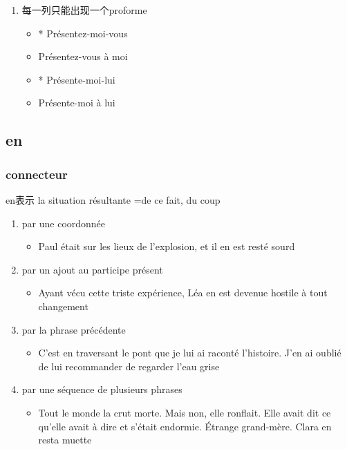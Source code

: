 \documentclass[UTF8]{report}
\begin{document}
\begin{enumerate}
    \item 每一列只能出现一个proforme
    \begin{itemize}
        \item * Présentez-moi-vous
        \item Présentez-vous à moi
        \item * Présente-moi-lui 
        \item Présente-moi à lui
    \end{itemize}
\end{enumerate}

\subsection{en}
\subsubsection{connecteur}
en表示 la situation résultante =de ce fait, du coup

\begin{enumerate}
    \item par une coordonnée
    \begin{itemize}
        \item Paul était sur les lieux de l’explosion, et il en est resté sourd
    \end{itemize}
    \item par un ajout au participe présent
    \begin{itemize}
        \item Ayant vécu cette triste expérience, Léa en est devenue hostile à tout changement
    \end{itemize}
    \item par la phrase précédente
    \begin{itemize}
        \item C’est en traversant le pont que je lui ai raconté l’histoire. J’en ai oublié de lui recommander de regarder l’eau grise
    \end{itemize}
    \item par une séquence de plusieurs phrases
    \begin{itemize}
        \item Tout le monde la crut morte. Mais non, elle ronflait. Elle avait dit ce qu’elle avait à dire et s’était endormie. Étrange grand-mère. Clara en resta muette
    \end{itemize}
\end{enumerate}
\end{document}
